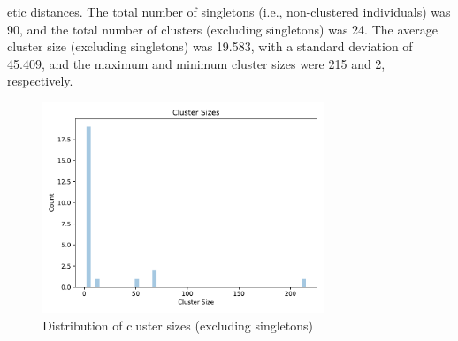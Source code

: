 \documentclass{article}
\begin{document}
etic distances.
The total number of singletons (i.e., non-clustered individuals) was 90,
and the total number of clusters (excluding singletons) was 24.
The average cluster size (excluding singletons) was 19.583,
with a standard deviation of 45.409,
and the maximum and minimum cluster sizes were 215 and 2, respectively.


\begin{figure}[h]
\centering
\includegraphics[width=0.75\textwidth,keepaspectratio]{./figs/cluster_sizes.pdf}
\caption{Distribution of cluster sizes (excluding singletons)}
\end{figure}
\end{document}
